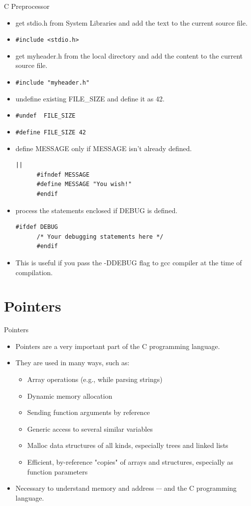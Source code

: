 \documentclass[10pt,t]{beamer}
\begin{document}
\begin{frame}{C Preprocessor}
\begin{itemize}
  \item get stdio.h from System Libraries and add the text to the current source file.
  \item[] \lstinline[basicstyle=\scriptsize\ttfamily]|#include <stdio.h>|
  \item get myheader.h from the local directory and add the content to the current source file.
  \item[] \lstinline[basicstyle=\scriptsize\ttfamily]|#include "myheader.h"|
  \item undefine existing FILE\_SIZE and define it as 42.
  \item[] \lstinline[basicstyle=\scriptsize\ttfamily]|#undef  FILE_SIZE|
  \item[] \lstinline[basicstyle=\scriptsize\ttfamily]|#define FILE_SIZE 42|
  \item define MESSAGE only if MESSAGE isn't already defined.
    \begin{lstlisting}[basicstyle=\scriptsize\ttfamily]||
      #ifndef MESSAGE
      #define MESSAGE "You wish!"
      #endif
    \end{lstlisting}
  \item process the statements enclosed if DEBUG is defined.
    \begin{lstlisting}[basicstyle=\scriptsize\ttfamily]
      #ifdef DEBUG
      /* Your debugging statements here */
      #endif
    \end{lstlisting}
  \item This is useful if you pass the -DDEBUG flag to gcc compiler at the time of compilation.    
  \end{itemize}
\end{frame}


\section{Pointers}
\begin{frame}{Pointers}
  \begin{itemize}
  \item Pointers are a very important part of the C programming language.
  \item They are used in many ways, such as:
    \begin{itemize}
    \item Array operations (e.g., while parsing strings)
    \item Dynamic memory allocation
    \item Sending function arguments by reference
    \item Generic access to several similar variables
    \item Malloc data structures of all kinds, especially trees and linked lists
    \item Efficient, by-reference "copies" of arrays and structures, especially as function parameters
    \end{itemize}
  \item Necessary to understand memory and address $\cdots$ and the C programming language.
  \end{itemize}
\end{frame}
\end{document}
